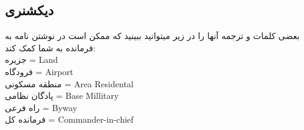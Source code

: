     \subsection{دیکشنری}
    بعضی کلمات و ترجمه آنها را در زیر میتوانید ببینید که ممکن است در نوشتن نامه به فرمانده به شما کمک کند:
    \\
    جزیره = 
    Land
    \\
    فرودگاه =
    Airport
    \\
    منطقه مسکونی =
    Area Residental
    \\
    پادگان نظامی =
    Base Millitary
    \\
    راه فرعی =
    Byway
    \\
    فرمانده کل =
    Commander-in-chief
    \\
    \\
    
    